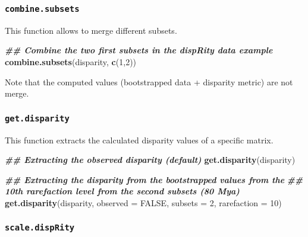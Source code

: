 \documentclass[
]{book}
\newenvironment{Shaded}{\begin{snugshade}}{\end{snugshade}}
\newcommand{\AttributeTok}[1]{\textcolor[rgb]{0.13,0.29,0.53}{#1}}
\newcommand{\ConstantTok}[1]{\textcolor[rgb]{0.56,0.35,0.01}{#1}}
\newcommand{\DecValTok}[1]{\textcolor[rgb]{0.00,0.00,0.81}{#1}}
\newcommand{\DocumentationTok}[1]{\textcolor[rgb]{0.56,0.35,0.01}{\textbf{\textit{#1}}}}
\newcommand{\FunctionTok}[1]{\textcolor[rgb]{0.13,0.29,0.53}{\textbf{#1}}}
\newcommand{\NormalTok}[1]{#1}
\begin{document}
\hypertarget{combine.subsets}{%
\subsubsection{\texorpdfstring{\texttt{combine.subsets}}{combine.subsets}}\label{combine.subsets}}

This function allows to merge different subsets.

\begin{Shaded}
\begin{Highlighting}[]
\DocumentationTok{\#\# Combine the two first subsets in the dispRity data example}
\FunctionTok{combine.subsets}\NormalTok{(disparity, }\FunctionTok{c}\NormalTok{(}\DecValTok{1}\NormalTok{,}\DecValTok{2}\NormalTok{))}
\end{Highlighting}
\end{Shaded}

Note that the computed values (bootstrapped data + disparity metric) are not merge.

\hypertarget{get.disparity}{%
\subsubsection{\texorpdfstring{\texttt{get.disparity}}{get.disparity}}\label{get.disparity}}

This function extracts the calculated disparity values of a specific matrix.

\begin{Shaded}
\begin{Highlighting}[]
\DocumentationTok{\#\# Extracting the observed disparity (default)}
\FunctionTok{get.disparity}\NormalTok{(disparity)}

\DocumentationTok{\#\# Extracting the disparity from the bootstrapped values from the}
\DocumentationTok{\#\# 10th rarefaction level from the second subsets (80 Mya)}
\FunctionTok{get.disparity}\NormalTok{(disparity, }\AttributeTok{observed =} \ConstantTok{FALSE}\NormalTok{, }\AttributeTok{subsets =} \DecValTok{2}\NormalTok{, }\AttributeTok{rarefaction =} \DecValTok{10}\NormalTok{)}
\end{Highlighting}
\end{Shaded}

\hypertarget{scale.disprity}{%
\subsubsection{\texorpdfstring{\texttt{scale.dispRity}}{scale.dispRity}}\label{scale.disprity}}
\end{document}
